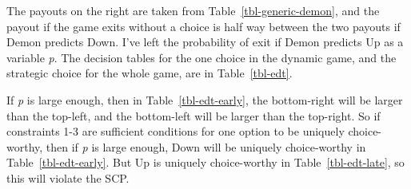 \documentclass[
  11pt,
  letterpaper,
  DIV=11,
  numbers=noendperiod,
  twoside]{scrartcl}
\begin{document}
The payouts on the right are taken from Table~\ref{tbl-generic-demon},
and the payout if the game exits without a choice is half way between
the two payouts if Demon predicts Down. I've left the probability of
exit if Demon predicts Up as a variable \emph{p}. The decision tables
for the one choice in the dynamic game, and the strategic choice for the
whole game, are in Table~\ref{tbl-edt}.

\begin{table}

\caption{\label{tbl-edt}Payout tables for Figure~\ref{fig-edt}.}

\begin{minipage}{0.50\linewidth}



\end{minipage}%
%
\begin{minipage}{0.50\linewidth}



\end{minipage}%

\end{table}%

If \emph{p} is large enough, then in Table~\ref{tbl-edt-early}, the
bottom-right will be larger than the top-left, and the bottom-left will
be larger than the top-right. So if constraints 1-3 are sufficient
conditions for one option to be uniquely choice-worthy, then if \emph{p}
is large enough, Down will be uniquely choice-worthy in
Table~\ref{tbl-edt-early}. But Up is uniquely choice-worthy in
Table~\ref{tbl-edt-late}, so this will violate the SCP.
\end{document}
